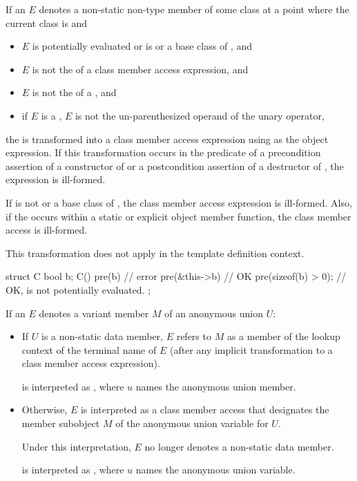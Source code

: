 \pnum
If an  $E$ denotes
a non-static non-type member of some class  at a point where
the current class is  and
\begin{itemize}
\item
$E$ is potentially evaluated or
 is  or a base class of , and
\item
$E$ is not the  of
a class member access expression, and
\item
$E$ is not the  of
a , and
\item
if $E$ is a ,
$E$ is not the un-parenthesized operand of
the unary \tcode{\&} operator,
\end{itemize}
the  is transformed into
a class member access expression using  as the object expression.
If this transformation occurs
in the predicate of a precondition assertion of a constructor of 
or a postcondition assertion of a destructor of ,
the expression is ill-formed.
\begin{note}
If  is not  or a base class of ,
the class member access expression is ill-formed.
Also, if the  occurs within
a static or explicit object member function,
the class member access is ill-formed.
\end{note}
This transformation does not apply in
the template definition context.
\begin{example}
\begin{codeblock}
struct C {
  bool b;
  C() pre(b)                // error
      pre(&this->b)         // OK
      pre(sizeof(b) > 0);   // OK,  is not potentially evaluated.
};
\end{codeblock}
\end{example}

\pnum
If an  $E$ denotes
a variant member $M$ of an anonymous union $U$:
\begin{itemize}
\item
If $U$ is a non-static data member,
$E$ refers to $M$ as a member of the lookup context of the terminal name of $E$
(after any implicit transformation to
a class member access expression).
\begin{example}
 is interpreted as ,
where $u$ names the anonymous union member.
\end{example}
\item
Otherwise, $E$ is interpreted as a class member access
that designates the member subobject $M$ of
the anonymous union variable for $U$.
\begin{note}
Under this interpretation, $E$ no longer denotes a non-static data member.
\end{note}
\begin{example}
 is interpreted as ,
where $u$ names the anonymous union variable.
\end{example}
\end{itemize}

